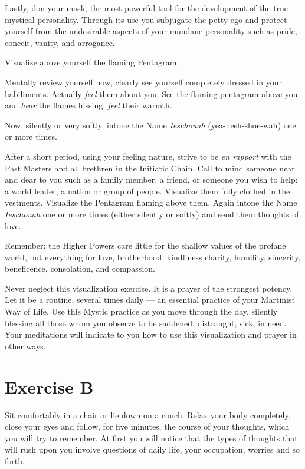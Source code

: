 \documentclass{article}
\begin{document}
Lastly, don your mask, the most powerful tool for the development of the true mystical personality. Through its use you subjugate the petty ego and protect yourself from the undesirable aspects of your mundane personality such as pride, conceit, vanity, and arrogance.

Visualize above yourself the flaming Pentagram. 

Mentally review yourself now, clearly see yourself completely dressed in your
habiliments. Actually \textit{feel} them about you. See the flaming pentagram above you and \textit{hear} the flames hissing; \textit{feel} their warmth. 

Now, silently or very softly, intone the Name \textit{Ieschouah} (yea-hesh-shoe-wah) one or more times.

After a short period, using your feeling nature, strive to be \textit{en rapport} with the Past Masters and all brethren in the Initiatic Chain. Call to mind someone near and dear to you such as a family member, a friend, or someone you wish to help: a world leader, a nation or group of people. Visualize them fully clothed in the vestments. Visualize the Pentagram flaming above them. Again intone the Name \textit{Ieschouah} one or more times (either silently or softly) and send them thoughts of love.

Remember: the Higher Powers care little for the shallow values of the profane world, but everything for love, brotherhood, kindliness charity, humility, sincerity, beneficence, consolation, and compassion.

Never neglect this visualization exercise. It is a prayer of the strongest potency. Let it be a routine, several times daily --- an essential practice of your Martinist Way of Life. Use this Mystic practice as you move through the day, silently blessing all those whom you observe to be saddened, distraught, sick, in need. Your meditations will indicate to you how to use this visualization and prayer in other ways. 

\section*{Exercise B}

Sit comfortably in a chair or lie down on a couch. Relax your body completely, close your eyes
and follow, for five minutes, the course of your thoughts, which you will try to remember. At
first you will notice that the types of thoughts that will rush upon you involve questions of daily
life, your occupation, worries and so forth.
\end{document}
